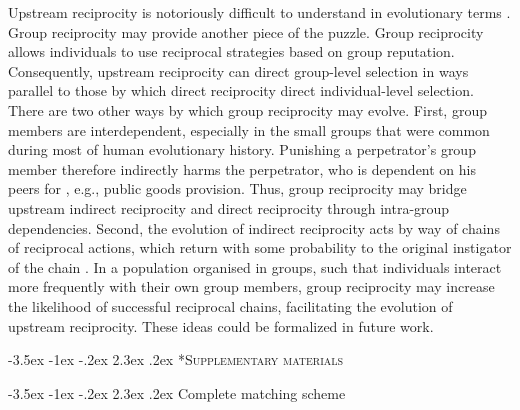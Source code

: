 \documentclass[12pt,a4paper]{article}\usepackage[]{graphicx}\usepackage[]{color}
\makeatletter
\renewcommand\section{\@startsection {section}{1}{\z@}%
{-3.5ex \@plus -1ex \@minus -.2ex}%
{2.3ex \@plus.2ex}%
{\bf\sffamily\Large}}
\makeatother
\begin{document}
Upstream reciprocity is notoriously difficult to understand in evolutionary
terms \citep{boyd1989evolution,nowak2007upstream}. Group reciprocity may provide another piece of 
the puzzle. Group reciprocity allows individuals to use reciprocal strategies based on group 
reputation. Consequently, upstream reciprocity can direct group-level selection in ways parallel 
to those by which direct reciprocity direct individual-level selection.
There are two other ways by which group reciprocity may evolve.
First, group members are interdependent, especially in the small groups that were common during most of human evolutionary 
history. Punishing a perpetrator's group member therefore indirectly harms the perpetrator, who is dependent on his peers for
, e.g., public goods provision. Thus, group reciprocity may bridge upstream indirect reciprocity and direct reciprocity 
through intra-group dependencies. Second, the evolution of indirect reciprocity acts by way of chains
of reciprocal actions, which return with some probability to the original
instigator of the chain \citep{nowak2007upstream}. In a population
organised in groups, such that individuals interact more frequently with
their own group members, group reciprocity may increase the likelihood
of successful reciprocal chains, facilitating the evolution of upstream
reciprocity. These ideas could be formalized in future work.



\newpage
\printbibliography
%
%

\newpage

\section*{\textsc{Supplementary materials}}

\setcounter{figure}{0}
\setcounter{section}{0}
\renewcommand\thesection{Appendix~\Alph{section}:}
\renewcommand\thefigure{\Alph{section}.\arabic{figure}}  

\section{Complete matching scheme}
\begin{center}
\begin{sideways}\resizebox{0.9\textheight}{!}{



}
\end{sideways}
\end{center}
\end{document}
